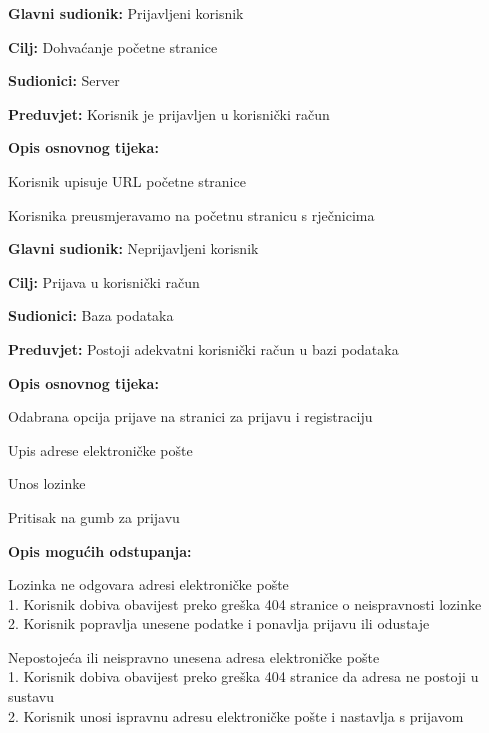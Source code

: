 					\noindent {}
					\begin{packed_item}
						\item \textbf{Glavni sudionik:} Prijavljeni korisnik
						\item \textbf{Cilj:} Dohvaćanje početne stranice
						\item \textbf{Sudionici:} Server
						\item \textbf{Preduvjet:} Korisnik je prijavljen u korisnički račun
						\item \textbf{Opis osnovnog tijeka:}
						\begin{packed_enum}
							\item Korisnik upisuje URL početne stranice
							\item Korisnika preusmjeravamo na početnu stranicu s rječnicima
						\end{packed_enum}
					\end{packed_item}


					\noindent \underbar{\textbf{UC2 Prijava u sustav}}
					\begin{packed_item}
						\item \textbf{Glavni sudionik:} Neprijavljeni korisnik
						\item \textbf{Cilj:} Prijava u korisnički račun
						\item \textbf{Sudionici:} Baza podataka
						\item \textbf{Preduvjet:} Postoji adekvatni korisnički račun u bazi podataka
						\item \textbf{Opis osnovnog tijeka:}
						\begin{packed_enum}
							\item Odabrana opcija prijave na stranici za prijavu i registraciju
							\item Upis adrese elektroničke pošte
							\item Unos lozinke
							\item Pritisak na gumb za prijavu
						\end{packed_enum}
						\item \textbf{Opis mogućih odstupanja:}
						\begin{packed_item}
							\item[3.a] Lozinka ne odgovara adresi elektroničke pošte
							\\1. Korisnik dobiva obavijest preko greška 404 stranice o neispravnosti lozinke
							\\2. Korisnik popravlja unesene podatke i ponavlja prijavu ili odustaje
							\item[2.a] Nepostojeća ili neispravno unesena adresa elektroničke pošte
							\\1. Korisnik dobiva obavijest preko greška 404 stranice da adresa ne postoji u sustavu
							\\2. Korisnik unosi ispravnu adresu elektroničke pošte i nastavlja s prijavom
						\end{packed_item}
					\end{packed_item}
					
